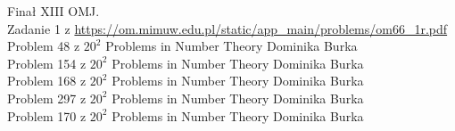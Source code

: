 
 Finał XIII OMJ. \\
 Zadanie 1 z \url{https://om.mimuw.edu.pl/static/app_main/problems/om66_1r.pdf} \\
 Problem 48 z $20^2$ Problems in Number Theory Dominika Burka \\
 Problem 154 z $20^2$ Problems in Number Theory Dominika Burka \\
 Problem 168 z $20^2$ Problems in Number Theory Dominika Burka \\
 Problem 297 z $20^2$ Problems in Number Theory Dominika Burka \\
 Problem 170 z $20^2$ Problems in Number Theory Dominika Burka \\
